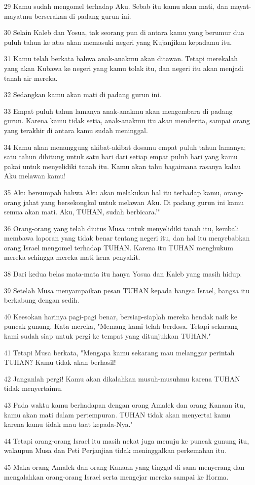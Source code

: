 \par 29 Kamu sudah mengomel terhadap Aku. Sebab itu kamu akan mati, dan mayat-mayatmu berserakan di padang gurun ini.
\par 30 Selain Kaleb dan Yosua, tak seorang pun di antara kamu yang berumur dua puluh tahun ke atas akan memasuki negeri yang Kujanjikan kepadamu itu.
\par 31 Kamu telah berkata bahwa anak-anakmu akan ditawan. Tetapi merekalah yang akan Kubawa ke negeri yang kamu tolak itu, dan negeri itu akan menjadi tanah air mereka.
\par 32 Sedangkan kamu akan mati di padang gurun ini.
\par 33 Empat puluh tahun lamanya anak-anakmu akan mengembara di padang gurun. Karena kamu tidak setia, anak-anakmu itu akan menderita, sampai orang yang terakhir di antara kamu sudah meninggal.
\par 34 Kamu akan menanggung akibat-akibat dosamu empat puluh tahun lamanya; satu tahun dihitung untuk satu hari dari setiap empat puluh hari yang kamu pakai untuk menyelidiki tanah itu. Kamu akan tahu bagaimana rasanya kalau Aku melawan kamu!
\par 35 Aku bersumpah bahwa Aku akan melakukan hal itu terhadap kamu, orang-orang jahat yang bersekongkol untuk melawan Aku. Di padang gurun ini kamu semua akan mati. Aku, TUHAN, sudah berbicara.'"
\par 36 Orang-orang yang telah diutus Musa untuk menyelidiki tanah itu, kembali membawa laporan yang tidak benar tentang negeri itu, dan hal itu menyebabkan orang Israel mengomel terhadap TUHAN. Karena itu TUHAN menghukum mereka sehingga mereka mati kena penyakit.
\par 38 Dari kedua belas mata-mata itu hanya Yosua dan Kaleb yang masih hidup.
\par 39 Setelah Musa menyampaikan pesan TUHAN kepada bangsa Israel, bangsa itu berkabung dengan sedih.
\par 40 Keesokan harinya pagi-pagi benar, bersiap-siaplah mereka hendak naik ke puncak gunung. Kata mereka, "Memang kami telah berdosa. Tetapi sekarang kami sudah siap untuk pergi ke tempat yang ditunjukkan TUHAN."
\par 41 Tetapi Musa berkata, "Mengapa kamu sekarang mau melanggar perintah TUHAN? Kamu tidak akan berhasil!
\par 42 Janganlah pergi! Kamu akan dikalahkan musuh-musuhmu karena TUHAN tidak menyertaimu.
\par 43 Pada waktu kamu berhadapan dengan orang Amalek dan orang Kanaan itu, kamu akan mati dalam pertempuran. TUHAN tidak akan menyertai kamu karena kamu tidak mau taat kepada-Nya."
\par 44 Tetapi orang-orang Israel itu masih nekat juga menuju ke puncak gunung itu, walaupun Musa dan Peti Perjanjian tidak meninggalkan perkemahan itu.
\par 45 Maka orang Amalek dan orang Kanaan yang tinggal di sana menyerang dan mengalahkan orang-orang Israel serta mengejar mereka sampai ke Horma.

